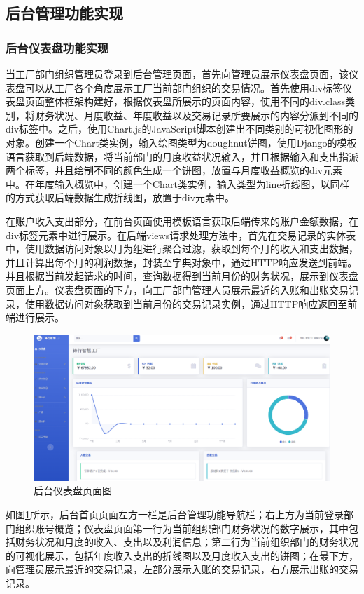 \subsection{后台管理功能实现}

\subsubsection{后台仪表盘功能实现}

当工厂部门组织管理员登录到后台管理页面，首先向管理员展示仪表盘页面，该仪表盘可以从工厂各个角度展示工厂当前部门组织的交易情况。首先使用div标签仪表盘页面整体框架构建好，根据仪表盘所展示的页面内容，使用不同的div.class类别，将财务状况、月度收益、年度收益以及交易记录所要展示的内容分派到不同的div标签中。之后，使用Chart.js的JavaScript脚本创建出不同类别的可视化图形的对象。创建一个Chart类实例，输入绘图类型为doughnut饼图，使用Django的模板语言获取到后端数据，将当前部门的月度收益状况输入，并且根据输入和支出指派两个标签，并且绘制不同的颜色生成一个饼图，放置与月度收益概览的div元素中。在年度输入概览中，创建一个Chart类实例，输入类型为line折线图，以同样的方式获取后端数据生成折线图，放置于div元素中。

在账户收入支出部分，在前台页面使用模板语言获取后端传来的账户金额数据，在div标签元素中进行展示。在后端views请求处理方法中，首先在交易记录的实体表中，使用数据访问对象以月为组进行聚合过滤，获取到每个月的收入和支出数据，并且计算出每个月的利润数据，封装至字典对象中，通过HTTP响应发送到前端。并且根据当前发起请求的时间，查询数据得到当前月份的财务状况，展示到仪表盘页面上方。仪表盘页面的下方，向工厂部门管理人员展示最近的入账和出账交易记录，使用数据访问对象获取到当前月份的交易记录实例，通过HTTP响应返回至前端进行展示。

\begin{figure}[H]
    \centering
    \includegraphics[width=.75\textwidth]{figures/5dashboard.png}
    \caption{后台仪表盘页面图}
    \label{fig:dashboard}
\end{figure}

如图\ref{fig:dashboard}所示，后台首页页面左方一栏是后台管理功能导航栏；右上方为当前登录部门组织账号概览；仪表盘页面第一行为当前组织部门财务状况的数字展示，其中包括财务状况和月度的收入、支出以及利润信息；第二行为当前组织部门的财务状况的可视化展示，包括年度收入支出的折线图以及月度收入支出的饼图；在最下方，向管理员展示最近的交易记录，左部分展示入账的交易记录，右方展示出账的交易记录。

